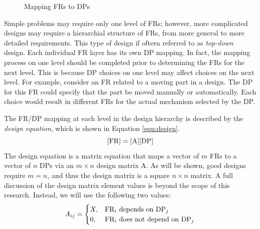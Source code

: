 \begin{figure}[h]
  \label{fig:mapping}
  \begin{center}
  \end{center}
  \caption{Mapping FRs to DPs}
\end{figure}

Simple problems may require only one level of FRs; however, more complicated designs may require a hierarchial
structure of FRs, from more general to more detailed requirements.  This type of design if oftern referred to as
\emph{top-down} design.  Each individual FR layer has its own DP mapping.  In fact, the mapping process on one
level should be completed prior to determining the FRs for the next level.  This is because DP choices on one level
may affect choices on the next level.  For example, consider an FR related to a moving part in a design.  The DP
for this FR could specify that the part be moved manually or automatically.  Each choice would result in different
FRs for the actual mechanism selected by the DP.

The FR/DP mapping at each level in the design hierarchy is described by the \emph{design equation}, which is shown
in Equation \ref{eqn:design}.
\begin{equation}
  \label{eqn:design}
  [\text{FR}]=[\text{A}][\text{DP}]
\end{equation}
The design equation is a matrix equation that maps a vector of \(m\) FRs to a vector of \(n\) DPs via an \(m\times
n\) design matrix A.  As will be shown, good designs require \(m=n\), and thus the design matrix is a square
\(n\times n\) matrix.  A full discussion of the design matrix element values is beyond the scope of this research.
Instead, we will use the following two values:
\[A_{ij}=\begin{cases}
X, & \text{FR}_i\ \text{depends on}\ \text{DP}_j \\
0, & \text{FR}_i\ \text{does not depend on}\ \text{DP}_j
\end{cases}\]

